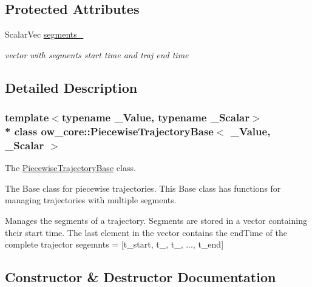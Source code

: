 \subsection*{Protected Attributes}
\begin{DoxyCompactItemize}
\item 
Scalar\+Vec \hyperlink{classow__core_1_1PiecewiseTrajectoryBase_ae677ff1d36778c37c39dedd975ec3eff}{segments\+\_\+}\hypertarget{classow__core_1_1PiecewiseTrajectoryBase_ae677ff1d36778c37c39dedd975ec3eff}{}\label{classow__core_1_1PiecewiseTrajectoryBase_ae677ff1d36778c37c39dedd975ec3eff}

\begin{DoxyCompactList}\small\item\em vector with segments start time and traj end time \end{DoxyCompactList}\end{DoxyCompactItemize}


\subsection{Detailed Description}
\subsubsection*{template$<$typename \+\_\+\+Value, typename \+\_\+\+Scalar$>$\\*
class ow\+\_\+core\+::\+Piecewise\+Trajectory\+Base$<$ \+\_\+\+Value, \+\_\+\+Scalar $>$}

The \hyperlink{classow__core_1_1PiecewiseTrajectoryBase}{Piecewise\+Trajectory\+Base} class. 

The Base class for piecewise trajectories. This Base class has functions for managing trajectories with multiple segments.

Manages the segments of a trajectory. Segments are stored in a vector containing their start time. The last element in the vector contains the end\+Time of the complete trajector segemnts = \mbox{[}t\+\_\+start, t\+\_, t\+\_, ..., t\+\_\+end\mbox{]} 

\subsection{Constructor \& Destructor Documentation}
